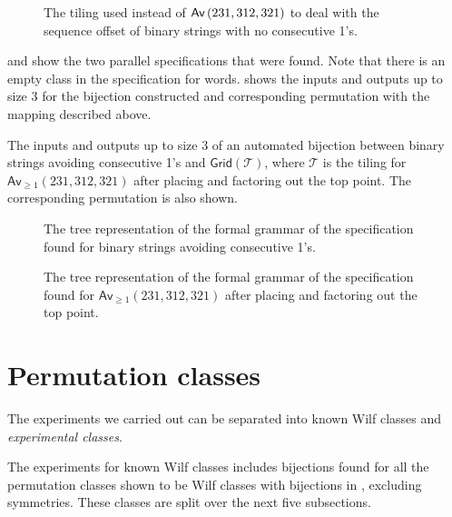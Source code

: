 \begin{figure}[!htbp]
    \centering
    
    \caption{The tiling used instead of $\textsf{Av}\left(231,312,321\right)$ to deal with the sequence offset of binary strings with no consecutive 1's.}
    \label{fig:fibpermoffbyone}
\end{figure}

 and  show the two parallel specifications that were found. Note that there is an empty class in the specification for words.  shows the inputs and outputs up to size $3$ for the bijection constructed and corresponding permutation with the mapping described above. 

\begin{table}[ht!]
    \centering
    
    \caption{The inputs and outputs up to size $3$ of an automated bijection between binary strings avoiding consecutive 1's and $\textsf{Grid}(\mathcal{T})$, where $\mathcal{T}$ is the tiling for $\textsf{Av}_{\geq1}(231,312,321)$ after placing and factoring out the top point. The corresponding permutation is also shown.}
    \label{tab:wordtilmap}
\end{table}

\begin{figure}
    \centering
    
    \vspace*{-12.5mm}
    \caption{The tree representation of the formal grammar of the specification found for binary strings avoiding consecutive 1's.}
    \label{fig:fibwordtree}
\end{figure}
\begin{figure}
    \centering
    
    \vspace*{-14mm}
    \caption{The tree representation of the formal grammar of the specification found for $\textsf{Av}_{\geq1}(231,312,321)$ after placing and factoring out the top point.}
    \label{fig:fibpermtree}
\end{figure}

\section{Permutation classes}
The experiments we carried out can be separated into known Wilf classes and \emph{experimental classes}.

The experiments for known Wilf classes includes bijections found for all the permutation classes shown to be Wilf classes with bijections in , excluding symmetries. These classes are split over the next five subsections.


